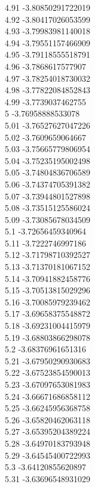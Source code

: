 {4.91	-3.80850291722019\\
4.92	-3.80417026053599\\
4.93	-3.79983981140018\\
4.94	-3.79551157466909\\
4.95	-3.79118555518791\\
4.96	-3.7868617577907\\
4.97	-3.78254018730032\\
4.98	-3.77822084852843\\
4.99	-3.7739037462755\\
5	-3.76958888533078\\
5.01	-3.76527627047226\\
5.02	-3.7609659064667\\
5.03	-3.75665779806954\\
5.04	-3.75235195002498\\
5.05	-3.74804836706589\\
5.06	-3.74374705391382\\
5.07	-3.73944801527898\\
5.08	-3.73515125586024\\
5.09	-3.73085678034509\\
5.1	-3.72656459340964\\
5.11	-3.7222746997186\\
5.12	-3.71798710392527\\
5.13	-3.71370181067152\\
5.14	-3.70941882458776\\
5.15	-3.70513815029296\\
5.16	-3.70085979239462\\
5.17	-3.69658375548872\\
5.18	-3.69231004415979\\
5.19	-3.68803866298078\\
5.2	-3.68376961651316\\
5.21	-3.67950290930683\\
5.22	-3.67523854590013\\
5.23	-3.67097653081983\\
5.24	-3.66671686858112\\
5.25	-3.66245956368758\\
5.26	-3.65820462063118\\
5.27	-3.65395204389224\\
5.28	-3.64970183793948\\
5.29	-3.64545400722993\\
5.3	-3.64120855620897\\
5.31	-3.63696548931029\\
}
